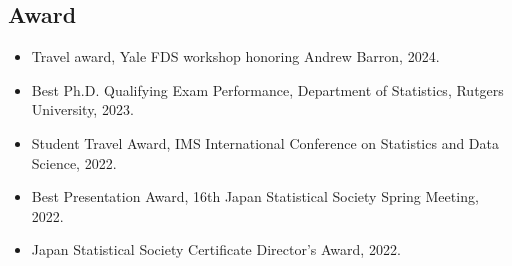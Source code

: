 \documentclass[10pt]{amsart}
\begin{document}
\subsection*{Award}
\begin{itemize}
  \item Travel award, Yale FDS workshop honoring Andrew Barron, 2024. 
  \item Best Ph.D. Qualifying Exam Performance, Department of Statistics, Rutgers University, 2023.
  \item Student Travel Award, IMS International Conference on Statistics and Data Science, 2022.
  \item Best Presentation Award, 16th Japan Statistical Society Spring Meeting, 2022. 
  \item Japan Statistical Society Certificate Director's Award, 2022.
\end{itemize}
\end{document}
